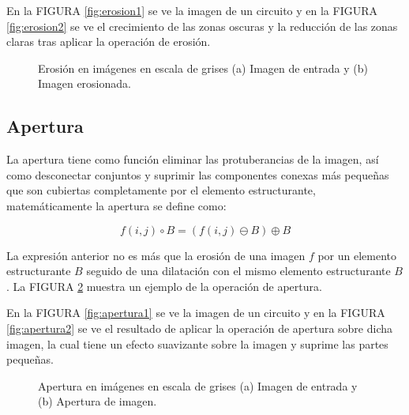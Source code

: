 
En la FIGURA \ref{fig:erosion1} se ve la imagen de un circuito y en la FIGURA \ref{fig:erosion2} se ve el crecimiento de las zonas oscuras y la reducción de las zonas claras tras aplicar la operación de erosión.



\begin{figure}[H]
	\centering
	\caption{Erosión en imágenes en escala de grises (a) Imagen de entrada y (b) Imagen erosionada.}
	\label{fig:erosion}
\end{figure}


    \subsection{Apertura}
    La apertura tiene como función eliminar las protuberancias de la imagen, así como desconectar conjuntos y suprimir las componentes conexas más pequeñas que son cubiertas completamente por el elemento estructurante, matemáticamente la apertura se define como: 
    
       \begin{equation}
\label{eq:apertura}
 f(i,j) \circ{B} = (f(i,j)\ominus{B})\oplus{B}
\end{equation}
   
La expresión anterior no es más que la erosión de una imagen $f$ por un elemento estructurante $B$ seguido de una dilatación con el mismo elemento estructurante $B$. La FIGURA \ref{fig:apertura} muestra un ejemplo de la operación de apertura.

En la FIGURA \ref{fig:apertura1} se ve la imagen de un circuito y en la FIGURA \ref{fig:apertura2} se ve el resultado de aplicar la operación de apertura sobre dicha imagen, la cual  tiene un efecto suavizante sobre la imagen y suprime las partes pequeñas.

\begin{figure}[H]
	\centering
	\caption{Apertura en imágenes en escala de grises (a) Imagen de entrada y (b) Apertura de imagen.}
	\label{fig:apertura}
\end{figure}


